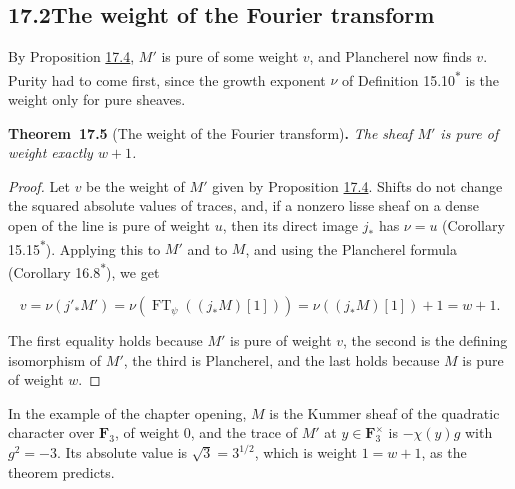 \documentclass[11pt]{article}
\newenvironment{bpstatement}[2]{\par\addvspace{0.6\baselineskip}\noindent\textbf{#1}#2\textbf{.}\enspace\ignorespaces}
  {\par\addvspace{0.4\baselineskip}}
\newenvironment{bpstatementit}[2]{\begin{bpstatement}{#1}{#2}\itshape\ignorespaces}{\end{bpstatement}}
\newcommand{\bpout}[1]{#1\textsuperscript{\hyperlink{bp-outside}{\ensuremath{\ast}}}}
\begin{document}
\subsection*{\texorpdfstring{17.2\quad The weight of the Fourier transform}{17.2 The weight of the Fourier transform}}
\label{bp14}%
\label{bp15}%
By Proposition \hyperref[bp12]{17.4}, \(M'\) is pure of some weight \(v\), and Plancherel now finds \(v\). Purity had to come first, since the growth exponent \(\nu\) of Definition \bpout{15.10} is the weight only for pure sheaves.

\label{bp16}%
\begin{bpstatementit}{Theorem~17.5}{ (The weight of the Fourier transform)}
The sheaf \(M'\) is pure of weight exactly \(w+1\).
\end{bpstatementit}

\begin{proof}[{Proof}]\label{bp17}%
Let \(v\) be the weight of \(M'\) given by Proposition \hyperref[bp12]{17.4}. Shifts do not change the squared absolute values of traces, and, if a nonzero lisse sheaf on a dense open of the line is pure of weight \(u\), then its direct image \(j_*\) has \(\nu=u\) (Corollary \bpout{15.15}). Applying this to \(M'\) and to \(M\), and using the Plancherel formula (Corollary \bpout{16.8}), we get

\[
v=\nu(j'_*M')
=\nu(\operatorname{FT}_\psi((j_*M)[1]))
=\nu((j_*M)[1])+1=w+1.
\]

The first equality holds because \(M'\) is pure of weight \(v\), the second is the defining isomorphism of \(M'\), the third is Plancherel, and the last holds because \(M\) is pure of weight \(w\).
\end{proof}

\label{bp18}%
In the example of the chapter opening, \(M\) is the Kummer sheaf of the quadratic character over \(\mathbf F_3\), of weight \(0\), and the trace of \(M'\) at \(y\in\mathbf F_3^\times\) is \(-\chi(y)g\) with \(g^2=-3\). Its absolute value is \(\sqrt3=3^{1/2}\), which is weight \(1=w+1\), as the theorem predicts.
\end{document}
